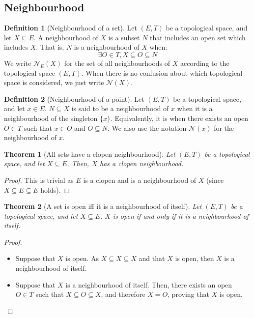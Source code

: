 \documentclass{article}
\newtheorem{theorem}{Theorem}[section]
\theoremstyle{definition}
\newtheorem{definition}{Definition}[section]
\theoremstyle{remark}
\theoremstyle{example}
\theoremstyle{notation}
\begin{document}
\subsection{Neighbourhood}

\begin{definition}[Neighbourhood of a set]
		Let $(E, T)$ be a topological space, and let $X \subseteq E$. A neighbourhood of $X$ is a subset $N$ that includes an open set which includes $X$. That is, $N$ is a neighbourhood of $X$ when:
				$$\exists O \in T, X \subseteq O \subseteq N$$
		We write $\mathcal{N}_E(X)$ for the set of all neighbourhoods of $X$ according to the topological space $(E, T)$. When there is no confusion about which topological space is considered, we just write $\mathcal{N}(X)$.
\end{definition}

\begin{definition}[Neighbourhood of a point]
		Let $(E, T)$ be a topological space, and let $x \in E$. $N \subseteq X$ is said to be a neighbourhood of $x$ when it is a neighbourhood of the singleton $\{x\}$. Equivalently, it is when there exists an open $O \in T$ such that $x \in O$ and $O \subseteq N$. We also use the notation $\mathcal{N}(x)$ for the neighbourhood of $x$.
\end{definition}

\begin{theorem}[All sets have a clopen neighbourhood] \label{thm:neighbourhood-existence}
		Let $(E, T)$ be a topological space, and let $X \subseteq E$. Then, $X$ has a clopen neighbourhood.
\end{theorem}

\begin{proof}
		This is trivial as $E$ is a clopen and is a neighbourhood of $X$ (since $X \subseteq E \subseteq E$ holds).
\end{proof}

\begin{theorem}[A set is open iff it is a neighbourhood of itself] \label{thm:open-eq-own-neighbourhood}
		Let $(E, T)$ be a topological space, and let $X \subseteq E$. $X$ is open if and only if it is a neighbourhood of itself.
\end{theorem}

\begin{proof}~
	\begin{itemize}
		\item Suppose that $X$ is open. As $X \subseteq X \subseteq X$ and that $X$ is open, then $X$ is a neighbourhood of itself.
		\item Suppose that $X$ is a neighbourhood of itself. Then, there exists an open $O \in T$ such that $X \subseteq O \subseteq X$, and therefore $X = O$, proving that $X$ is open.
	\end{itemize}
\end{proof}
\end{document}

